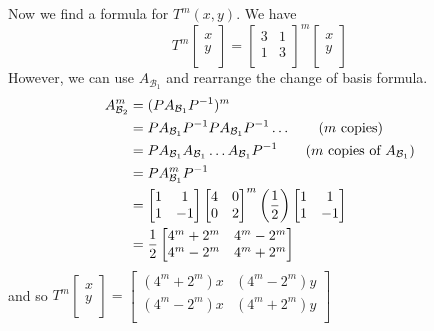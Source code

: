 \documentclass{article}
\begin{document}
\begin{example}
  Now we find a formula for $T^m(x, y)$. We have \[
    T^m
    \begin{bmatrix}
      x\\y\\
    \end{bmatrix} =
    \begin{bmatrix}
      3 & 1\\
      1 & 3\\
    \end{bmatrix}^m
    \begin{bmatrix}
      x\\y\\
    \end{bmatrix}
  \] However, we can use $A_{\mathcal{B}_1}$ and rearrange the change of basis formula.
  \begin{align*}
    A_{\mathcal{B}_2}^m &= (PA_{\mathcal{B}_1}P^{-1})^m\\
    &= PA_{\mathcal{B}_1}P^{-1}PA_{\mathcal{B}_1}P^{-1} \dots \tag{$m$ copies}\\
    &= PA_{\mathcal{B}_1}A_{\mathcal{B}_1}\dots A_{\mathcal{B}_1}P^{-1} \tag{$m$ copies of $A_{\mathcal{B}_1}$}\\
    &= PA_{\mathcal{B}_1}^mP^{-1}\\
    &=
    \begin{bmatrix}
      1 & 1\\
      1 & -1\\
    \end{bmatrix}
    \begin{bmatrix}
      4 & 0\\
      0 & 2\\
    \end{bmatrix}^m \left(\frac{1}{2}\right)
    \begin{bmatrix}
      1 & 1\\
      1 & -1\\
    \end{bmatrix}\\
    &= \frac{1}{2}
    \begin{bmatrix}
      4^m + 2^m & 4^m - 2^m\\
      4^m - 2^m & 4^m + 2^m\\
    \end{bmatrix}
  \end{align*} and so $T^m
  \begin{bmatrix}
    x\\y\\
  \end{bmatrix} =
  \begin{bmatrix}
    (4^m + 2^m)x & (4^m - 2^m)y\\
    (4^m - 2^m)x & (4^m + 2^m)y\\
  \end{bmatrix}$
\end{example}
\end{document}

